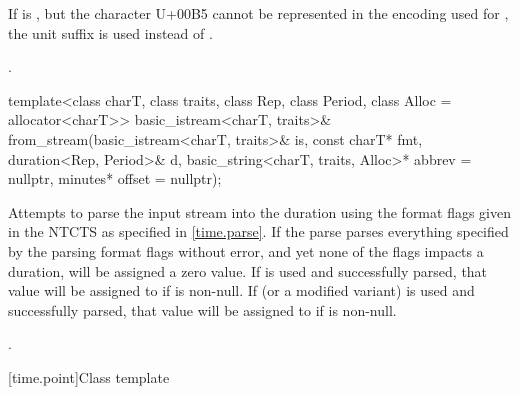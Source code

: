 \begin{itemdescr}
\pnum
If  is ,
but the character U+00B5 cannot be represented in
the encoding used for ,
the unit suffix  is used instead of .

\pnum
\returns
{}.
\end{itemdescr}

%
\begin{itemdecl}
template<class charT, class traits, class Rep, class Period, class Alloc = allocator<charT>>
  basic_istream<charT, traits>&
    from_stream(basic_istream<charT, traits>& is, const charT* fmt,
                duration<Rep, Period>& d,
                basic_string<charT, traits, Alloc>* abbrev = nullptr,
                minutes* offset = nullptr);
\end{itemdecl}

\begin{itemdescr}
\pnum
\effects
Attempts to parse the input stream 
into the duration 
using the format flags given in the NTCTS 
as specified in \ref{time.parse}.
If the parse parses everything specified by the parsing format flags without error,
and yet none of the flags impacts a duration,
 will be assigned a zero value.
If  is used and successfully parsed,
that value will be assigned to  if  is non-null.
If  (or a modified variant) is used and successfully parsed,
that value will be assigned to  if  is non-null.

\pnum
\returns
{}.
\end{itemdescr}

[time.point]{Class template }

